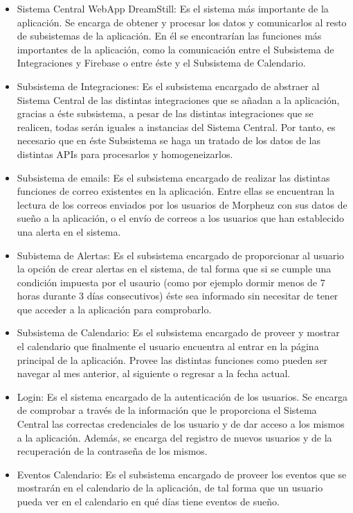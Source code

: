 \documentclass[11pt,openany]{book}
\begin{document}
\begin{itemize}
\item Sistema Central WebApp DreamStill: Es el sistema más importante de la aplicación. Se encarga de obtener y procesar los datos y comunicarlos al resto de subsistemas de la aplicación. En él se encontrarían las funciones más importantes de la aplicación, como la comunicación entre el Subsistema de Integraciones y Firebase o entre éste y el Subsistema de Calendario.
\item Subsistema de Integraciones: Es el subsistema encargado de abstraer al Sistema Central de las distintas integraciones que se añadan a la aplicación, gracias a éste subsistema, a pesar de las distintas integraciones que se realicen, todas serán iguales a instancias del Sistema Central. Por tanto, es necesario que en éste Subsistema se haga un tratado de los datos de las distintas APIs para procesarlos y homogeneizarlos.
\item Subsistema de emails: Es el subsistema encargado de realizar las distintas funciones de correo existentes en la aplicación. Entre ellas se encuentran la lectura de los correos enviados por los usuarios de Morpheuz con sus datos de sueño a la aplicación, o el envío de correos a los usuarios que han establecido una alerta en el sistema.
\item Subistema de Alertas: Es el subsistema encargado de proporcionar al usuario la opción de crear alertas en el sistema, de tal forma que si se cumple una condición impuesta por el usaurio (como por ejemplo dormir menos de 7 horas durante 3 días consecutivos) éste sea informado sin necesitar de tener que acceder a la aplicación para comprobarlo.
\item Subsistema de Calendario: Es el subsistema encargado de proveer y mostrar el calendario que finalmente el usuario encuentra al entrar en la página principal de la aplicación. Provee las distintas funciones como pueden ser navegar al mes anterior, al siguiente o regresar a la fecha actual.
\item Login: Es el sistema encargado de la autenticación de los usuarios. Se encarga de comprobar a través de la información que le proporciona el Sistema Central las correctas credenciales de los usuario y de dar acceso a los mismos a la aplicación. Además, se encarga del registro de nuevos usuarios y de la recuperación de la contraseña de los mismos.
\item Eventos Calendario: Es el subsistema encargado de proveer los eventos que se mostrarán en el calendario de la aplicación, de tal forma que un usuario pueda ver en el calendario en qué días tiene eventos de sueño.

\end{itemize}
\end{document}
